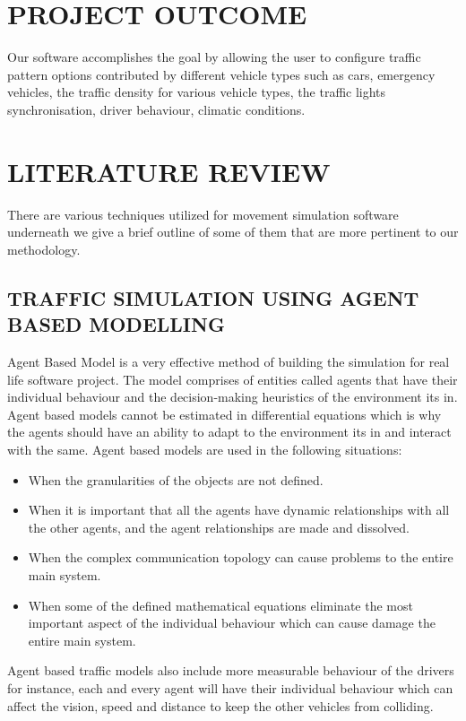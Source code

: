 \documentclass[11pt,a4paper]{article}
\begin{document}
\section{PROJECT OUTCOME}

Our software accomplishes the goal by allowing the user to configure traffic pattern options contributed by different vehicle types such as cars, emergency vehicles, the traffic density for various vehicle types, the traffic lights synchronisation, driver behaviour, climatic conditions.


\section{LITERATURE REVIEW}

There are various techniques utilized for movement simulation software underneath we give a brief outline of some of them that are more pertinent to our methodology. 

\subsection{TRAFFIC SIMULATION USING AGENT BASED MODELLING}

Agent Based Model is a very effective method of building the simulation for real life software project. The model comprises of entities called agents that have their individual behaviour and the decision-making heuristics of the environment its in. Agent based models cannot be estimated in differential equations which is why the agents should have an ability to adapt to the environment its in and interact with the same.
Agent based models are used in the following situations:

\begin{itemize}
\item When the granularities of the objects are not defined.
\item When it is important that all the agents have dynamic relationships with all the other agents, and the agent relationships are made and dissolved.
\item When the complex communication topology can cause problems to the entire main system.
\item When some of the defined mathematical equations eliminate the most important aspect of the individual behaviour which can cause damage the entire main system.
\end{itemize}
Agent based traffic models also include more measurable behaviour of the drivers for instance, each and every agent will have their individual behaviour which can affect the vision, speed and distance to keep the other vehicles from colliding. 
\end{document}
